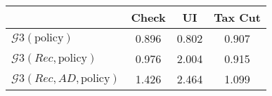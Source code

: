 \begin{tabular}{@{}lccc@{}} 
\toprule 
                          & Check      & UI    & Tax Cut    \\  \midrule 
$\mathcal{G}3(\text{policy})$ & 0.896  & 0.802  & 0.907     \\ 
$\mathcal{G}3(Rec,\text{policy})$ & 0.976  & 2.004  & 0.915     \\ 
$\mathcal{G}3(Rec, AD,\text{policy})$ & 1.426  & 2.464  & 1.099     \\ 
\end{tabular}  
